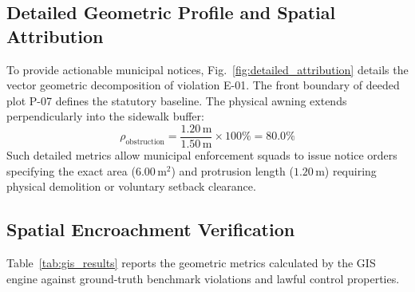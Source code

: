 \documentclass[conference]{IEEEtran}
\begin{document}
\subsection{Detailed Geometric Profile and Spatial Attribution}
To provide actionable municipal notices, Fig.~\ref{fig:detailed_attribution} details the vector geometric decomposition of violation E-01. The front boundary of deeded plot P-07 defines the statutory baseline. The physical awning extends perpendicularly into the sidewalk buffer:
\begin{equation}
\rho_{\text{obstruction}} = \frac{1.20\,\text{m}}{1.50\,\text{m}} \times 100\% = 80.0\%
\end{equation}
Such detailed metrics allow municipal enforcement squads to issue notice orders specifying the exact area ($6.00\,\text{m}^2$) and protrusion length ($1.20\,\text{m}$) requiring physical demolition or voluntary setback clearance.

\subsection{Spatial Encroachment Verification}
Table~\ref{tab:gis_results} reports the geometric metrics calculated by the GIS engine against ground-truth benchmark violations and lawful control properties.

\begin{table}[!t]
\caption{Spatial Engine Geometric Compliance Metrics Against Ground-Truth Benchmarks}
\label{tab:gis_results}
\centering
{}
\end{table}
\end{document}
